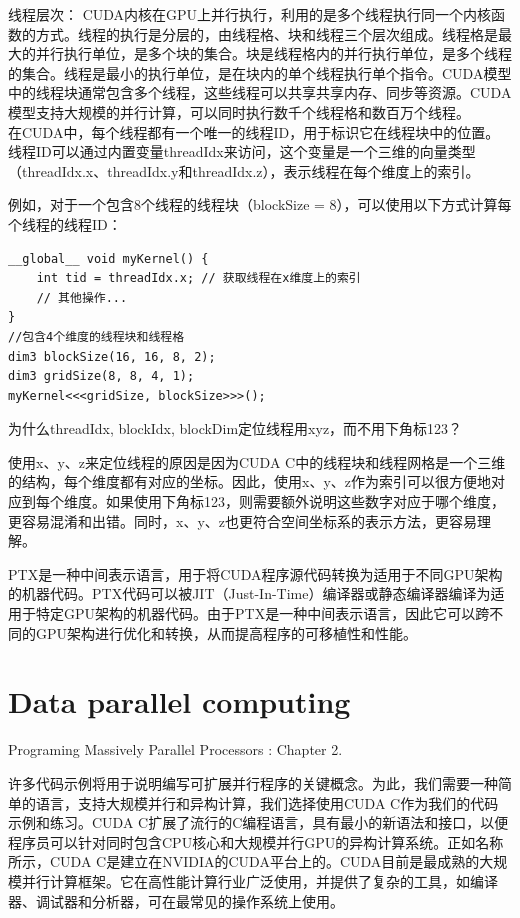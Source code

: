 \documentclass[11pt]{ctexart}
\begin{document}
线程层次：
CUDA内核在GPU上并行执行，利用的是多个线程执行同一个内核函数的方式。线程的执行是分层的，由线程格、块和线程三个层次组成。线程格是最大的并行执行单位，是多个块的集合。块是线程格内的并行执行单位，是多个线程的集合。线程是最小的执行单位，是在块内的单个线程执行单个指令。CUDA模型中的线程块通常包含多个线程，这些线程可以共享共享内存、同步等资源。CUDA模型支持大规模的并行计算，可以同时执行数千个线程格和数百万个线程。\\


在CUDA中，每个线程都有一个唯一的线程ID，用于标识它在线程块中的位置。线程ID可以通过内置变量threadIdx来访问，这个变量是一个三维的向量类型（threadIdx.x、threadIdx.y和threadIdx.z），表示线程在每个维度上的索引。

例如，对于一个包含8个线程的线程块（blockSize = 8），可以使用以下方式计算每个线程的线程ID：

\begin{lstlisting}
__global__ void myKernel() {
    int tid = threadIdx.x; // 获取线程在x维度上的索引
    // 其他操作...
}
//包含4个维度的线程块和线程格
dim3 blockSize(16, 16, 8, 2);
dim3 gridSize(8, 8, 4, 1);
myKernel<<<gridSize, blockSize>>>();

\end{lstlisting}

为什么threadIdx, blockIdx, blockDim定位线程用xyz，而不用下角标123？

使用x、y、z来定位线程的原因是因为CUDA C中的线程块和线程网格是一个三维的结构，每个维度都有对应的坐标。因此，使用x、y、z作为索引可以很方便地对应到每个维度。如果使用下角标123，则需要额外说明这些数字对应于哪个维度，更容易混淆和出错。同时，x、y、z也更符合空间坐标系的表示方法，更容易理解。

PTX是一种中间表示语言，用于将CUDA程序源代码转换为适用于不同GPU架构的机器代码。PTX代码可以被JIT（Just-In-Time）编译器或静态编译器编译为适用于特定GPU架构的机器代码。由于PTX是一种中间表示语言，因此它可以跨不同的GPU架构进行优化和转换，从而提高程序的可移植性和性能。

\newpage
\section{Data parallel computing}
Programing Massively Parallel Processors :  Chapter 2.

许多代码示例将用于说明编写可扩展并行程序的关键概念。为此，我们需要一种简单的语言，支持大规模并行和异构计算，我们选择使用CUDA C作为我们的代码示例和练习。CUDA C扩展了流行的C编程语言，具有最小的新语法和接口，以便程序员可以针对同时包含CPU核心和大规模并行GPU的异构计算系统。正如名称所示，CUDA C是建立在NVIDIA的CUDA平台上的。CUDA目前是最成熟的大规模并行计算框架。它在高性能计算行业广泛使用，并提供了复杂的工具，如编译器、调试器和分析器，可在最常见的操作系统上使用。
\end{document}
